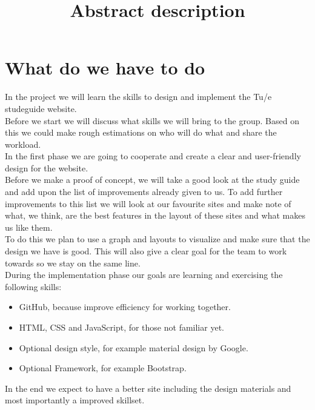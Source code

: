 \documentclass[a4paper,10pt]{article}
\title{Abstract description}
\begin{document}
\maketitle
\section*{What do we have to do}
In the project we will learn the skills to design and implement the Tu/e studeguide website.\\
Before we start we will discuss what skills we will bring to the group. Based on this we could make rough estimations on who will do what and share the workload.\\
In the first phase we are going to cooperate and create a clear and user-friendly design for the website.\\
Before we make a proof of concept, we will take a good look at the study guide and add upon the list of improvements already given to us. To add further improvements to this list we will look at our favourite sites and make note of what, we think, are the best features in the layout of these sites and what makes us like them.\\
To do this we plan to use a graph and layouts to visualize and make sure that the design we have is good. This will also give a clear goal for the team to work towards so we stay on the same line.\\
During the implementation phase our goals are learning and exercising the following skills:\\
\begin{itemize}
  \item GitHub, because improve efficiency for working together.
  \item HTML, CSS and JavaScript, for those not familiar yet.
  \item Optional design style, for example material design by Google.
  \item Optional Framework, for example Bootstrap.
\end{itemize}
In the end we expect to have a better site including the design materials and most importantly a improved skillset.\\
\end{document}
